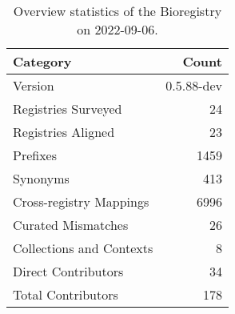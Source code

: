 \begin{table}
\centering
\caption{Overview statistics of the Bioregistry on 2022-09-06.}
\label{tab:bioregistry-summary}
\begin{tabular}{lr}
\toprule
                Category &      Count \\
\midrule
                 Version & 0.5.88-dev \\
     Registries Surveyed &         24 \\
      Registries Aligned &         23 \\
                Prefixes &       1459 \\
                Synonyms &        413 \\
 Cross-registry Mappings &       6996 \\
      Curated Mismatches &         26 \\
Collections and Contexts &          8 \\
     Direct Contributors &         34 \\
      Total Contributors &        178 \\
\bottomrule
\end{tabular}
\end{table}
